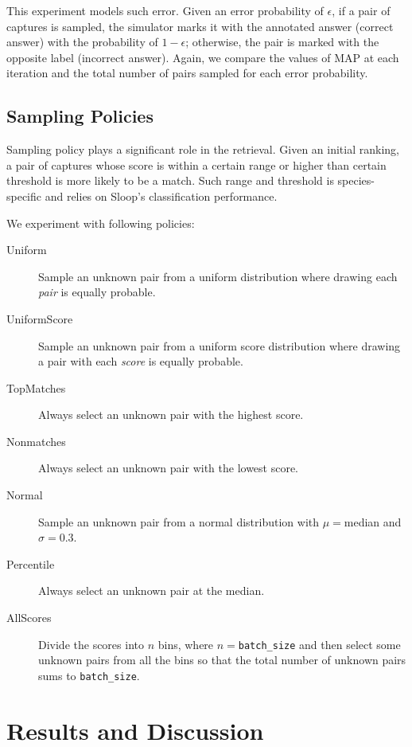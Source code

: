 This experiment models such error. Given an error probability of $\epsilon$, if
a pair of captures is sampled, the simulator marks it with the annotated answer
(correct answer) with the probability of $1-\epsilon$; otherwise, the pair is
marked with the opposite label (incorrect answer). Again, we compare the values
of MAP at each iteration and the total number of pairs sampled for each error
probability.

\subsection{Sampling Policies} %
\label{sub:sampling_policies}

Sampling policy plays a significant role in the retrieval. Given an initial
ranking, a pair of captures whose score is within a certain range or higher
than certain threshold is more likely to be a match. Such range and threshold
is species-specific and relies on Sloop's classification performance.

We experiment with following policies:
\begin{description}
  \item [Uniform]
  Sample an unknown pair from a uniform distribution where drawing each
    \emph{pair} is equally probable.
  \item [UniformScore]
  Sample an unknown pair from a uniform score distribution where drawing a pair
    with each \emph{score} is equally probable.
  \item [TopMatches]
  Always select an unknown pair with the highest score.
  \item [Nonmatches]
  Always select an unknown pair with the lowest score.
  \item [Normal]
  Sample an unknown pair from a normal distribution with $\mu=$median and
    $\sigma=0.3$.
  \item [Percentile]
  Always select an unknown pair at the median.
  \item [AllScores]
  Divide the scores into $n$ bins, where $n=$\texttt{batch\_size} and then
  select some unknown pairs from all the bins so that the total number of
  unknown pairs sums to \texttt{batch\_size}.
\end{description}



\section{Results and Discussion} %
\label{sec:results}

